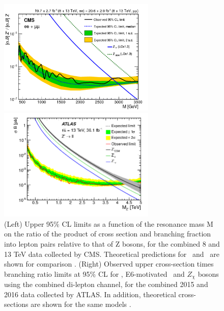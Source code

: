 \begin{itemize}
\begin{figure}[ht]
\begin{minipage}[b]{0.4\linewidth} %
\centering
\includegraphics[width=7.5cm]{figuras/Chapter1/CMSZprime2dileptonRun2Run12}
\end{minipage}
\hspace{0.5cm} %
\begin{minipage}[b]{0.6\linewidth}
\centering
\includegraphics[width=7.5cm]{figuras/Chapter1/ATLASZprime2dilepton.png}
\end{minipage}
\caption{(Left) Upper 95$\%$ CL limits as a function of the resonance mass 
M on the ratio of the product of cross section and branching fraction into 
lepton pairs relative to that of Z bosons, for the combined 8 and 13 TeV data collected by CMS. Theoretical 
predictions for \ZprimeSSM~and \Zprimepsi~are shown for comparison \cite{CMSZprimetodileptonrun1run2}. (Right) Observed upper cross-section 
times branching ratio limits at 95$\%$ CL for \Zprime, E6-motivated \Zprimepsi~and $Z_{\chi}$ bosons
using the combined di-lepton channel, for the combined 2015 and 2016 data collected by ATLAS. 
In addition, theoretical cross-sections are shown for the same models \cite{ATLASZprimetodileptonrun2}.} \label{CMSATLASdileptonresult}
\end{figure}


\end{itemize}
